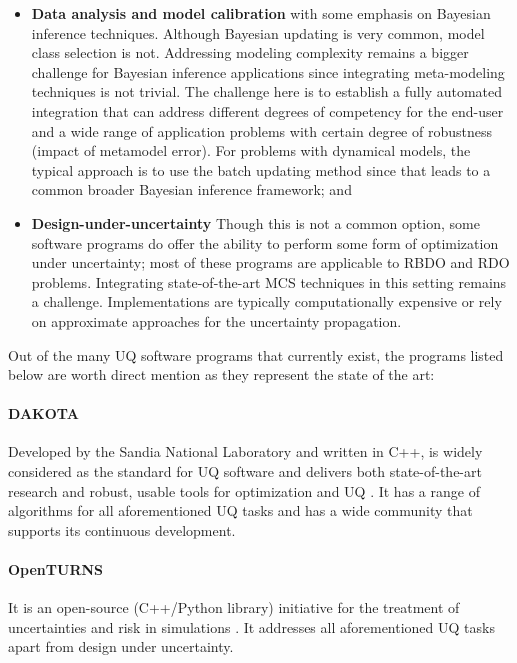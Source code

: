 \begin{itemize}
    \item \textbf{Data analysis and model calibration} with some emphasis on Bayesian inference techniques. Although Bayesian updating is very common, model class selection is not. Addressing modeling complexity remains a bigger challenge for Bayesian inference applications since integrating meta-modeling techniques is not trivial. The challenge here is to establish a fully automated integration that can address different degrees of competency for the end-user and a wide range of application problems with certain degree of robustness (impact of metamodel error). For problems with dynamical models, the typical approach is to use the batch updating method since that leads to a common broader Bayesian inference framework; and

    \item \textbf{Design-under-uncertainty} Though this is not a common option, some software programs do offer the ability to perform some form of optimization under uncertainty; most of these programs are applicable to RBDO and RDO problems. Integrating state-of-the-art MCS techniques in this setting remains a challenge. Implementations are typically computationally expensive or rely on approximate approaches for the uncertainty propagation.
\end{itemize}

\noindent Out of the many UQ software programs that currently exist, the programs listed below are worth direct mention as they represent the state of the art: 

\paragraph{DAKOTA} Developed by the Sandia National Laboratory and written in C++,  is widely considered as the standard for UQ software and delivers both state-of-the-art research and robust, usable tools for optimization and UQ \citep{adams2009dakota}. It has a range of algorithms for all aforementioned UQ tasks and has a wide community that supports its continuous development. 

\paragraph{OpenTURNS} It is an open-source (C++/Python library) initiative for the treatment of uncertainties and risk in simulations \citep{andrianov2007open}. It addresses all aforementioned UQ tasks apart from design under uncertainty. 

